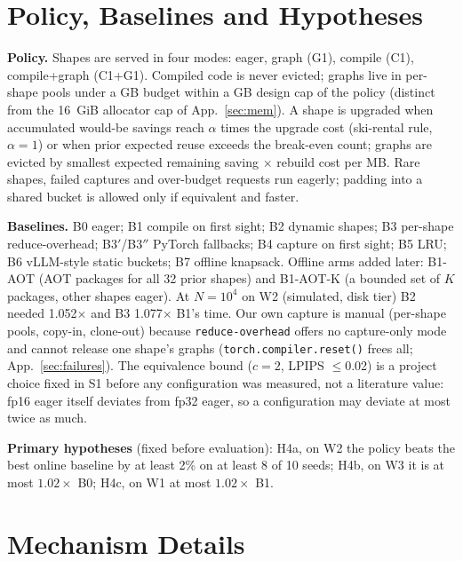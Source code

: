 \documentclass[conference]{IEEEtran}
\begin{document}
\section{Policy, Baselines and Hypotheses}\label{sec:method}
\textbf{Policy.} Shapes are served in four modes: eager, graph (G1), compile (C1), compile+graph (C1+G1). Compiled code is never evicted; graphs live in per-shape pools under a \NMemGraphBudgetGB{} GB budget within a \NMemCapGB{} GB design cap of the policy (distinct from the 16~GiB allocator cap of App.~\ref{sec:mem}). A shape is upgraded when accumulated would-be savings reach $\alpha$ times the upgrade cost (ski-rental rule, $\alpha{=}1$) or when prior expected reuse exceeds the break-even count; graphs are evicted by smallest expected remaining saving $\times$ rebuild cost per MB. Rare shapes, failed captures and over-budget requests run eagerly; padding into a shared bucket is allowed only if equivalent and faster.

\textbf{Baselines.} B0 eager; B1 compile on first sight; B2 dynamic shapes; B3 per-shape reduce-overhead; B3$'$/B3$''$ PyTorch fallbacks; B4 capture on first sight; B5 LRU; B6 vLLM-style static buckets; B7 offline knapsack. Offline arms added later: B1-AOT (AOT packages for all 32 prior shapes) and B1-AOT-K (a bounded set of $K$ packages, other shapes eager).
At $N{=}10^4$ on W2 (simulated, disk tier) B2 needed 1.052$\times$ and B3 1.077$\times$ B1's time. Our own capture is manual (per-shape pools, copy-in, clone-out) because \texttt{reduce-overhead} offers no capture-only mode and cannot release one shape's graphs (\texttt{torch.compiler.reset()} frees all; App.~\ref{sec:failures}). The equivalence bound ($c{=}2$, LPIPS $\le$0.02) is a project choice fixed in S1 before any configuration was measured, not a literature value: fp16 eager itself deviates from fp32 eager, so a configuration may deviate at most twice as much.

\textbf{Primary hypotheses} (fixed before evaluation): H4a, on W2 the policy beats the best online baseline by at least 2\% on at least 8 of 10 seeds; H4b, on W3 it is at most $1.02\times$ B0; H4c, on W1 at most $1.02\times$ B1.

\section{Mechanism Details}\label{sec:mech}
\end{document}
